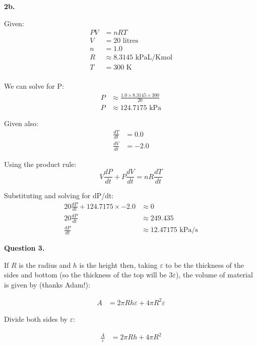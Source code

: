 \documentclass[12pt,a4paper]{report}
\begin{document}
\textbf{2b.}

Given:
\begingroup
\addtolength{\jot}{0.5em}
\begin{align}
PV &= nRT \\
V &= 20\text{ litres}  \\
n &= 1.0  \\
R &\approx 8.3145 \text{ kPaL/Kmol} \\
T &= 300\text{ K} \\
\end{align}
\endgroup

We can solve for P:
\begingroup
\addtolength{\jot}{0.5em}
\begin{align}
P &\approx  \frac{1.0 \times 8.3145 \times 300}{20} \\
P &\approx  124.7175 \text{ kPa}
\end{align}
\endgroup

Given also:
\begingroup
\addtolength{\jot}{0.5em}
\begin{align}
\frac{dT}{dt} &= 0.0  \\
\frac{dV}{dt} &= -2.0
\end{align}
\endgroup

Using the product rule:
\begin{equation}
V\frac{dP}{dt} + P \frac{dV}{dt} = nR\frac{dT}{dt}
\end{equation}

Substituting and solving for dP/dt:
\begingroup
\addtolength{\jot}{0.5em}
\begin{align}
20 \frac{dP}{dt} + 124.7175 \times -2.0 & \approx 0 \\
20 \frac{dP}{dt} & \approx 249.435 \\
\frac{dP}{dt} & \approx 12.47175 \text{ kPa/s}
\end{align}
\endgroup

\textbf{Question 3.}

If \(R\) is the radius and \(h\) is the height then, taking \(\varepsilon\) to be the thickness of the sides and bottom (so the thickness of the top will be \( 3\varepsilon\)), the volume of material is given by (thanks Adam!):

\begingroup
\addtolength{\jot}{0.5em}
\begin{align}
A &= 2\pi Rh \varepsilon + 4\pi R^2 \varepsilon
\end{align}
\endgroup

Divide both sides by \(\varepsilon\):

\begingroup
\addtolength{\jot}{0.5em}
\begin{align}
\frac{A}{\varepsilon} &= 2\pi Rh + 4\pi R^2
\end{align}
\endgroup
\end{document}
